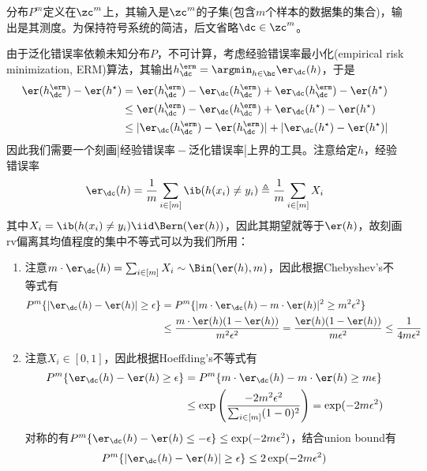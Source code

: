 \documentclass{ctexart}
\begin{document}
\begin{remark}
    分布$P^m$定义在$\zc^m$上，其输入是$\zc^m$的子集(包含$m$个样本的数据集的集合)，输出是其测度。为保持符号系统的简洁，后文省略$\dc \in \zc^m$。
\end{remark}

由于泛化错误率依赖未知分布$P$，不可计算，考虑经验错误率最小化(empirical risk minimization, ERM)算法，其输出$h_\dc^\erm = \argmin_{h \in \hc} \er_\dc (h)$，于是
\begin{align} \label{eq-estimation-error}
    \begin{split}
        \er(h_\dc^\erm) - \er(h^\star) & = \er(h_\dc^\erm) - \er_{\dc} (h_\dc^\erm) + \er_{\dc} (h_\dc^\erm) - \er(h^\star)  \\
                                         & \le \er(h_\dc^\erm) - \er_{\dc} (h_\dc^\erm) + \er_{\dc} (h^\star) - \er(h^\star)     \\
                                         & \le |\er_{\dc} (h_\dc^\erm) - \er(h_\dc^\erm)| + |\er_{\dc} (h^\star) - \er(h^\star)|
    \end{split}
\end{align}
因此我们需要一个刻画$|\text{经验错误率} - \text{泛化错误率}|$上界的工具。注意给定$h$，经验错误率
\begin{align*}
    \er_\dc (h) = \frac{1}{m} \sum_{i \in [m]} \ib(h(x_i) \ne y_i) \triangleq \frac{1}{m} \sum_{i \in [m]} X_i
\end{align*}
其中$X_i = \ib(h(x_i) \ne y_i) \iid \Bern(\er(h))$，因此其期望就等于$\er(h)$，故刻画rv偏离其均值程度的集中不等式可以为我们所用：
\begin{enumerate}
    \item 注意$m \cdot \er_\dc (h) = \sum_{i \in [m]} X_i \sim \Bin(\er(h), m)$，因此根据Chebyshev's不等式有
          \begin{align*}
              P^m \{ |\er_\dc (h) - \er (h)| \ge \epsilon \}
               & = P^m \{ |m \cdot \er_\dc (h) - m \cdot \er (h)|^2 \ge m^2 \epsilon^2 \}                                                     \\
               & \le \frac{m \cdot \er(h) (1 - \er(h))}{m^2 \epsilon^2} = \frac{\er(h) (1 - \er(h))}{m \epsilon^2} \le \frac{1}{4 m \epsilon^2}
          \end{align*}
    \item 注意$X_i \in [0, 1]$，因此根据Hoeffding's不等式有
          \begin{align*}
              P^m \{ \er_\dc (h) - \er (h) \ge \epsilon \}
               & = P^m \{ m \cdot \er_\dc (h) - m \cdot \er (h) \ge m \epsilon \}                                \\
               & \le \exp \left(\frac{-2 m^2 \epsilon^2}{\sum_{i \in [m]} (1-0)^2} \right) = \exp(-2 m \epsilon^2)
          \end{align*}
          对称的有$P^m \{ \er_\dc (h) - \er (h) \le -\epsilon \} \le \exp(-2 m \epsilon^2)$，结合union bound有
          \begin{align*}
              P^m \{ |\er_\dc (h) - \er (h)| \ge \epsilon \} \le 2 \exp(-2 m \epsilon^2)
          \end{align*}
\end{enumerate}
\end{document}
